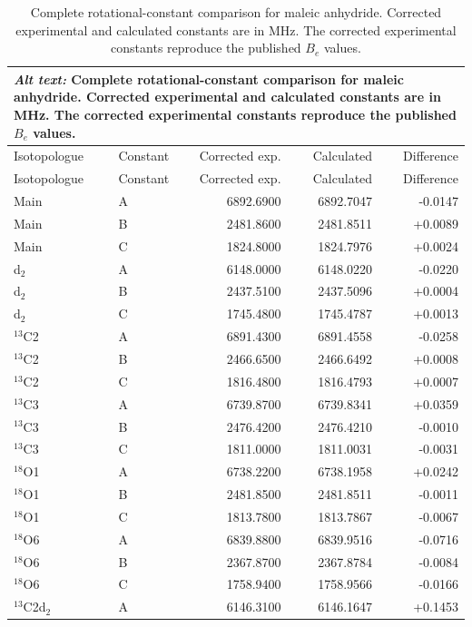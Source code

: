 \documentclass[12pt]{article}
\begin{document}
\begin{longtable}{llrrr}
\caption{Complete rotational-constant comparison for maleic anhydride.
Corrected experimental and calculated constants are in MHz. The corrected
experimental constants reproduce the published $B_e$ values.}
\label{tab:si-maleic-rotconstants}\\
\multicolumn{5}{p{0.98\linewidth}}{\textit{Alt text:} Complete rotational-constant comparison for maleic anhydride. Corrected experimental and calculated constants are in MHz. The corrected experimental constants reproduce the published $B_e$ values.}\\
\toprule
Isotopologue & Constant & Corrected exp. & Calculated & Difference \\
\midrule
\endfirsthead
\toprule
Isotopologue & Constant & Corrected exp. & Calculated & Difference \\
\midrule
\endhead
Main & A & 6892.6900 & 6892.7047 & -0.0147 \\
Main & B & 2481.8600 & 2481.8511 & +0.0089 \\
Main & C & 1824.8000 & 1824.7976 & +0.0024 \\
d$_2$ & A & 6148.0000 & 6148.0220 & -0.0220 \\
d$_2$ & B & 2437.5100 & 2437.5096 & +0.0004 \\
d$_2$ & C & 1745.4800 & 1745.4787 & +0.0013 \\
$^{13}$C2 & A & 6891.4300 & 6891.4558 & -0.0258 \\
$^{13}$C2 & B & 2466.6500 & 2466.6492 & +0.0008 \\
$^{13}$C2 & C & 1816.4800 & 1816.4793 & +0.0007 \\
$^{13}$C3 & A & 6739.8700 & 6739.8341 & +0.0359 \\
$^{13}$C3 & B & 2476.4200 & 2476.4210 & -0.0010 \\
$^{13}$C3 & C & 1811.0000 & 1811.0031 & -0.0031 \\
$^{18}$O1 & A & 6738.2200 & 6738.1958 & +0.0242 \\
$^{18}$O1 & B & 2481.8500 & 2481.8511 & -0.0011 \\
$^{18}$O1 & C & 1813.7800 & 1813.7867 & -0.0067 \\
$^{18}$O6 & A & 6839.8800 & 6839.9516 & -0.0716 \\
$^{18}$O6 & B & 2367.8700 & 2367.8784 & -0.0084 \\
$^{18}$O6 & C & 1758.9400 & 1758.9566 & -0.0166 \\
$^{13}$C2d$_2$ & A & 6146.3100 & 6146.1647 & +0.1453 \\

\end{longtable}
\end{document}
